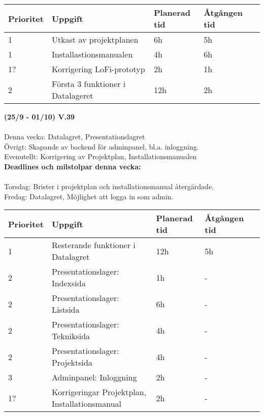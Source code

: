\documentclass{TDP003mall}
\begin{document}
\begin{table}[]
  \begin{tabular}{|l|l|l|l|l|}
  \hline
   Prioritet & Uppgift                    & Planerad tid & Åtgången tid \\ \hline
   1         & Utkast av projektplanen  & 6h          & 5h          \\ \hline
   1         & Installastionsmanualen  & 4h           & 6h      \\ \hline
   1?        & Korrigering LoFi-prototyp &2h          & 1h       \\ \hline
   2         & Första 3 funktioner i Datalageret & 12h           & 2h          \\ \hline
  \end{tabular}
  \end{table}

  \hrulefill

  \textbf{(25/9 - 01/10) V.39}\\\\
  Denna vecka: Datalagret, Presentationslagret\\
  Övrigt: Skapande av backend för adminpanel, bl.a. inloggning.\\
  Evenutellt: Korrigering av Projektplan, Installationsmanualen\\

  \textbf{Deadlines och milstolpar denna vecka: }\\\\
  Torsdag: Brister i projektplan och installationsmanual återgärdade.\\
  Fredag: Datalagret, Möjlighet att logga in som admin.\\


\begin{table}[]
  \begin{tabular}{|l|l|l|l|l|}
  \hline
   Prioritet & Uppgift                    & Planerad tid & Åtgången tid \\ \hline
   1         & Resterande funktioner i Datalagret & 12h          & 5h          \\ \hline
   2        & Presentationslager: Indexsida  & 1h           & -       \\ \hline
   2        & Presentationslager: Listsida &6h          & -       \\ \hline
   2         & Presentationslager: Tekniksida & 4h          & -           \\ \hline
   2         & Presentationslager: Projektsida & 4h         & - \\ \hline
   3         & Adminpanel: Inloggning & 2h         & - \\ \hline
   1?    & Korrigeringar  Projektplan, Installationsmanual& 2h         & - \\ \hline
  \end{tabular}
  \end{table}
\end{document}
